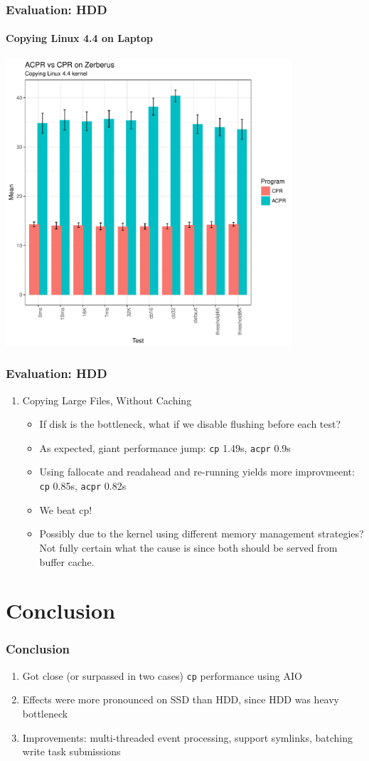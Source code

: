 \documentclass{beamer}
\begin{document}
\begin{frame}
    \frametitle{Evaluation: HDD}
    \framesubtitle{Copying Linux 4.4 on Laptop}
    \centering
    \includegraphics[width=0.8\textwidth,height=0.8\textheight,]{CSRES_Linux_Barplot.pdf}
\end{frame}

\begin{frame}
\frametitle{Evaluation: HDD}
\begin{enumerate}[1.]
\item{Copying Large Files, Without Caching}
\begin{itemize}
	\item If disk is the bottleneck, what if we disable flushing before each test?
	\item As expected, giant performance jump: \texttt{cp} 1.49s, \texttt{acpr} 0.9s
	\item Using fallocate and readahead and re-running yields more improvmeent: \texttt{cp} 0.85s, \texttt{acpr} 0.82s
	\item We beat cp!
	\item Possibly due to the kernel using different memory management strategies? Not fully certain what the cause is since both should be served from buffer cache.
\end{itemize}
\end{enumerate}
\end{frame}

\section{Conclusion}
\begin{frame}
\frametitle{Conclusion}
\begin{enumerate}[1.]
\item Got close (or surpassed in two cases) \texttt{cp} performance using AIO
\item Effects were more pronounced on SSD than HDD, since HDD was heavy bottleneck
\item Improvements: multi-threaded event processing, support symlinks, batching write task submissions
\end{enumerate}
\end{frame}
\end{document}
